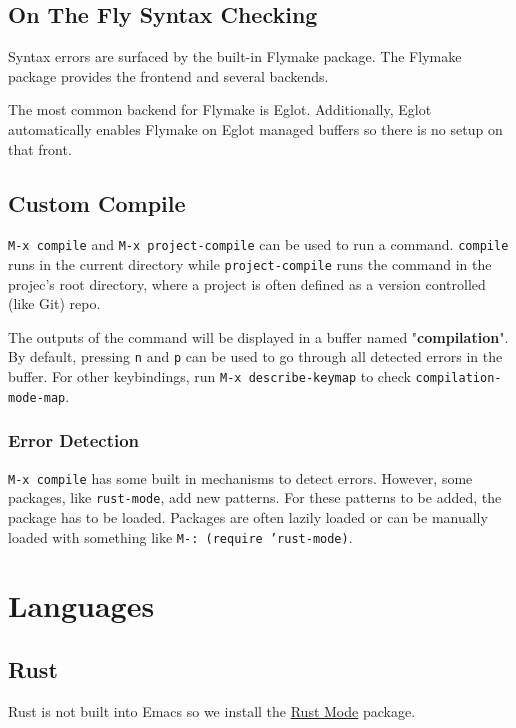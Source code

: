 \documentclass[11pt]{article}
\begin{document}
\subsection{On The Fly Syntax Checking}
\label{sec:org090d89d}

Syntax errors are surfaced by the built-in Flymake package. The Flymake package
provides the frontend and several backends.

The most common backend for Flymake is Eglot. Additionally, Eglot automatically
enables Flymake on Eglot managed buffers so there is no setup on that front.
\subsection{Custom Compile}
\label{sec:orgf426013}

\texttt{M-x compile} and \texttt{M-x project-compile} can be used to run a command. \texttt{compile}
runs in the current directory while \texttt{project-compile} runs the command in the
projec's root directory, where a project is often defined as a version
controlled (like Git) repo.

The outputs of the command will be displayed in a buffer named
"\textbf{compilation}". By default, pressing \texttt{n} and \texttt{p} can be used to go through all
detected errors in the buffer. For other keybindings, run \texttt{M-x describe-keymap}
to check \texttt{compilation-mode-map}.
\subsubsection{Error Detection}
\label{sec:org520aab5}

\texttt{M-x compile} has some built in mechanisms to detect errors. However, some
packages, like \texttt{rust-mode}, add new patterns. For these patterns to be added,
the package has to be loaded. Packages are often lazily loaded or can be
manually loaded with something like \texttt{M-: (require 'rust-mode)}.
\section{Languages}
\label{sec:org3ed504b}

\subsection{Rust}
\label{sec:org5fcaed3}

Rust is not built into Emacs so we install the \href{https://github.com/rust-lang/rust-mode/tree/25d91cff281909e9b7cb84e31211c4e7b0480f94}{Rust Mode} package.
\end{document}
